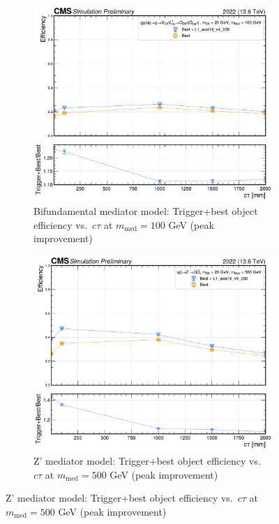 \begin{figure}[h]
  \centering

  \begin{subfigure}[t]{0.45\textwidth}
    \centering
    \includegraphics[width=\linewidth]{images/L1/ad_1D_tchan/trigeffplots1D_L1_efftype-trigplusbest_t-channel_mDark-20_mMed-100_L1_axol1tl_v4_200_study_cloppear.pdf}
    \caption{Bifundamental mediator model: Trigger+best object efficiency vs.\ $c\tau$ at $m_\mathrm{med} = 100$ GeV (peak improvement)}
    \label{fig:axol1tl_eff1D_tchan}
  \end{subfigure}
  \hfill
  \begin{subfigure}[t]{0.45\textwidth}
    \centering
    \includegraphics[width=\linewidth]{images/L1/ad_1D_schan/trigeffplots1D_L1_efftype-trigplusbest_s-channel_mDark-20_mMed-500_L1_axol1tl_v4_200_study_cloppear.pdf}
    \caption{Z' mediator model: Trigger+best object efficiency vs.\ $c\tau$ at $m_\mathrm{med} = 500$ GeV (peak improvement)}
    \label{fig:axol1tl_eff1D_schan}
  \end{subfigure}


\end{figure}
